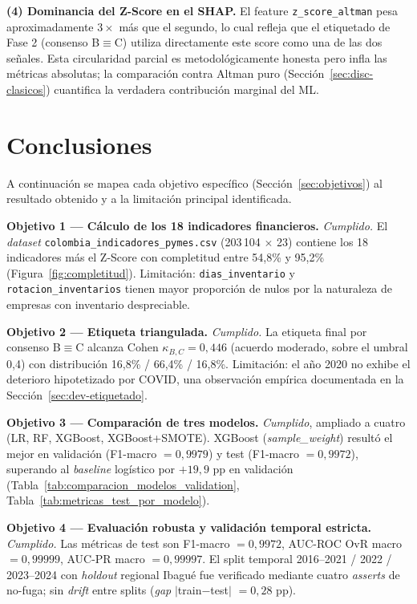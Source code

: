 \documentclass[12pt, letterpaper]{article}
\newcommand{\zaltscore}{Z\textquotesingle\textquotesingle-Score}
\begin{document}
\textbf{(4) Dominancia del \zaltscore{} en el SHAP.} El feature \texttt{z\_score\_altman} pesa aproximadamente $3\times$ m\'as que el segundo, lo cual refleja que el etiquetado de Fase 2 (consenso B$\equiv$C) utiliza directamente este score como una de las dos se\~nales. Esta circularidad parcial es metodol\'ogicamente honesta pero infla las m\'etricas absolutas; la comparaci\'on contra Altman puro (Secci\'on~\ref{sec:disc-clasicos}) cuantifica la verdadera contribuci\'on marginal del ML.

\section{Conclusiones}
\label{sec:conclusiones}

A continuaci\'on se mapea cada objetivo espec\'ifico (Secci\'on~\ref{sec:objetivos}) al resultado obtenido y a la limitaci\'on principal identificada.

\textbf{Objetivo 1 --- C\'alculo de los 18 indicadores financieros.} \emph{Cumplido.} El \textit{dataset} \texttt{colombia\_indicadores\_pymes.csv} (203\,104 $\times$ 23) contiene los 18 indicadores m\'as el \zaltscore{} con completitud entre 54,8\% y 95,2\% (Figura~\ref{fig:completitud}). Limitaci\'on: \texttt{dias\_inventario} y \texttt{rotacion\_inventarios} tienen mayor proporci\'on de nulos por la naturaleza de empresas con inventario despreciable.

\textbf{Objetivo 2 --- Etiqueta triangulada.} \emph{Cumplido.} La etiqueta final por consenso B$\equiv$C alcanza Cohen $\kappa_{B,C} = 0{,}446$ (acuerdo moderado, sobre el umbral 0,4) con distribuci\'on 16,8\% / 66,4\% / 16,8\%. Limitaci\'on: el a\~no 2020 no exhibe el deterioro hipotetizado por COVID, una observaci\'on emp\'irica documentada en la Secci\'on~\ref{sec:dev-etiquetado}.

\textbf{Objetivo 3 --- Comparaci\'on de tres modelos.} \emph{Cumplido}, ampliado a cuatro (LR, RF, XGBoost, XGBoost+SMOTE). XGBoost (\textit{sample\_weight}) result\'o el mejor en validaci\'on (F1-macro $= 0{,}9979$) y test (F1-macro $= 0{,}9972$), superando al \textit{baseline} log\'istico por $+19{,}9$ pp en validaci\'on (Tabla~\ref{tab:comparacion_modelos_validation}, Tabla~\ref{tab:metricas_test_por_modelo}).

\textbf{Objetivo 4 --- Evaluaci\'on robusta y validaci\'on temporal estricta.} \emph{Cumplido.} Las m\'etricas de test son F1-macro $= 0{,}9972$, AUC-ROC OvR macro $= 0{,}99999$, AUC-PR macro $= 0{,}99997$. El split temporal 2016--2021 / 2022 / 2023--2024 con \textit{holdout} regional Ibagu\'e fue verificado mediante cuatro \textit{asserts} de no-fuga; sin \textit{drift} entre splits (\textit{gap} $|$train$-$test$|$ $= 0{,}28$ pp).
\end{document}

